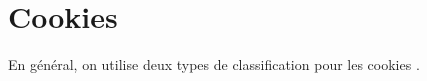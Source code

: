 
%

\section{Cookies}
\label{cookies}
En général, on utilise deux types de classification pour les cookies \cite{Yue:2007:ACU:1251984.1253093}.

